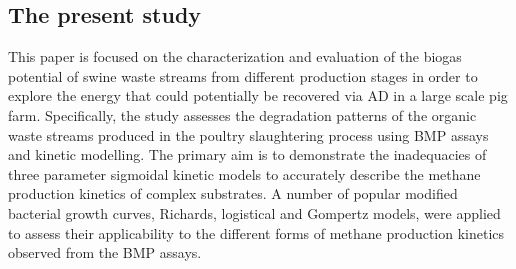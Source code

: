 \subsection{The present study}
This paper is focused on the characterization and evaluation of the biogas potential of swine waste streams from different production stages in order to explore the energy that could potentially be recovered via AD in a large scale pig farm. Specifically, the study assesses the degradation patterns of the organic waste streams produced in the poultry slaughtering process using BMP assays and kinetic modelling. The primary aim is to demonstrate the inadequacies of three parameter sigmoidal kinetic models to accurately describe the methane production kinetics of complex substrates. A number of popular modified bacterial growth curves, Richards, logistical and Gompertz models, were applied to assess their applicability to the different forms of methane production kinetics observed from the BMP assays.